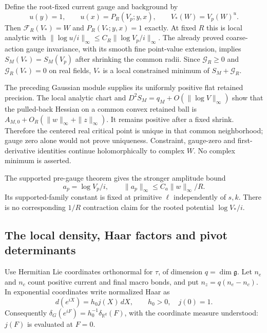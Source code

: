Define the root-fixed current gauge and background by
\begin{equation}\label{cmi-rooted-background}
 u(y)=1,\qquad u(x)=P_R(V_p;y,x),\qquad V_*(W)=V_p(W)^u.
\end{equation}
Then $\mathcal F_R(V_*)=W$ and $P_R(V_*;y,x)=1$ exactly.
At fixed $R$ this is local analytic with
$\|\log u/i\|_\infty\le C_R\|\log V_p/i\|_\infty$.
The already proved coarse-action gauge invariance, with its
smooth fine point-value extension, implies $S_M(V_*)=S_M(V_p)$
after shrinking the common radii. Since $\mathcal G_R\ge0$
and $\mathcal G_R(V_*)=0$ on real fields, $V_*$ is a local
constrained minimum of $S_M+\mathcal G_R$.

The preceding Gaussian module supplies its uniformly positive
flat retained precision. The local analytic chart and
$D^2S_M=q_M+O(\|\log V\|_\infty)$ show that the pulled-back
Hessian on a common convex retained ball is
$A_{M,0}+O_R(\|w\|_\infty+\|z\|_\infty)$. It remains positive
after a fixed shrink. Therefore the centered real critical
point is unique in that common neighborhood; gauge zero
alone would not prove uniqueness. Constraint, gauge-zero and
first-derivative identities continue holomorphically to complex
$W$. No complex minimum is asserted.

The supported pre-gauge theorem gives the stronger amplitude
bound
\begin{equation}\label{cmi-pregauge-amplitude}
 a_p=\log V_p/i,\qquad
 \|a_p\|_\infty\le C_a\|w\|_\infty/R.
\end{equation}
Its supported-family constant is fixed at primitive $\ell$
independently of $s,k$. There is no corresponding $1/R$
contraction claim for the rooted potential $\log V_*/i$.

\subsection{The local density, Haar factors and pivot determinants}
\label{cmi-density-section}

Use Hermitian Lie coordinates orthonormal for $\tau$, of
dimension $q=\dim\mathfrak g$. Let $n_e$ and $n_c$ count
positive current and final macro bonds, and put
$n_z=q(n_e-n_c)$. In exponential coordinates write normalized
Haar as
\begin{equation}\label{cmi-Haar}
 d(e^{iX})=h_0j(X)\,dX,\qquad h_0>0,\quad j(0)=1.
\end{equation}
Consequently
$\delta_G(e^{iF})=h_0^{-1}\delta_{\mathbb R^q}(F)$,
with the coordinate measure understood: $j(F)$ is evaluated
at $F=0$.

